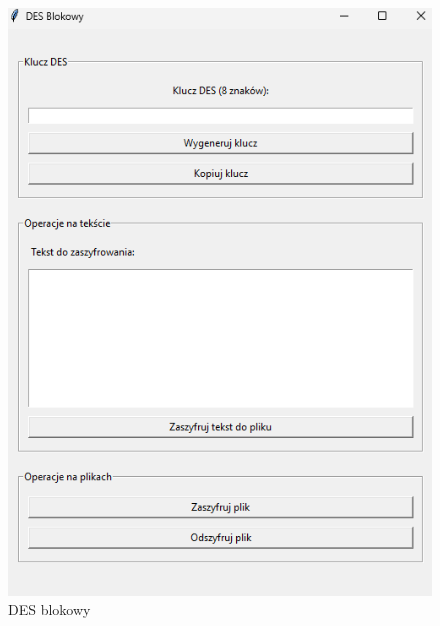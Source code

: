 \documentclass[12pt,a4paper]{article}
\begin{document}
\begin{figure}[!htb]
\begin{center}
\includegraphics[scale=0.45]{pictures/desblokowy.png}
\caption{DES blokowy}
\label{fig:DES blokowy}
\end{center}
\end{figure}


\newpage
\end{document}
